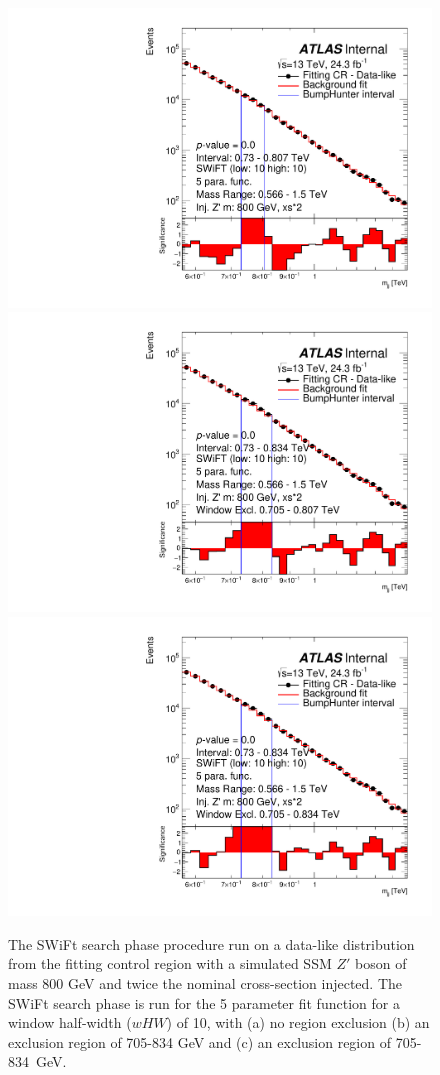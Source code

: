 \begin{figure}[!htb]
\captionsetup[subfigure]{aboveskip=0pt,justification=centering}
\centering
{} {
  \includegraphics[width=0.45\linewidth, angle=0]{figs/Dibjet/LowMass/FitStudy_min566/bhFit_corrFitCR_dataLike_5para_low10_high10_inj_Zprimebb800_xsFactor2.pdf}
}
 {
  \includegraphics[width=0.45\linewidth, angle=0]{figs/Dibjet/LowMass/FitStudy_min566/bhFit_corrFitCR_dataLike_5para_low10_high10_inj_Zprimebb800_xsFactor2_removedWindow.pdf}
}\\
 {
  \includegraphics[width=0.45\linewidth, angle=0]{figs/Dibjet/LowMass/FitStudy_min566/bhFit_corrFitCR_dataLike_5para_low10_high10_inj_Zprimebb800_xsFactor2_removedWindow2.pdf}
}
\vspace{10pt}
\caption{\label{fig:bhFit_lm_corrFitCR_dataLike_inj_Zprimebb800_xsFactor2_wHW10}
  The SWiFt search phase procedure run on a data-like distribution
  from the fitting control region with a simulated SSM $Z'$ boson of mass 800 GeV and twice the nominal cross-section injected.
  The SWiFt search phase is run for the 5 parameter fit function for a window half-width ($wHW$) of 10,
  with (a) no region exclusion (b) an exclusion region of 705-834 GeV and (c) an exclusion region of 705-834~GeV.}
\end{figure}

